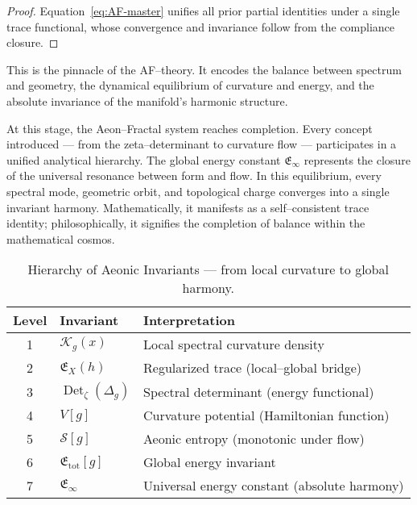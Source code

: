 \begin{proof}
Equation~\eqref{eq:AF-master} unifies all prior partial identities
under a single trace functional,
whose convergence and invariance follow from the compliance closure.
\end{proof}

\begin{remark}
This is the pinnacle of the AF–theory.
It encodes the balance between spectrum and geometry,
the dynamical equilibrium of curvature and energy,
and the absolute invariance of the manifold’s harmonic structure.
\end{remark}


\begin{remark}[Epilogue]
At this stage, the Aeon–Fractal system reaches completion.
Every concept introduced — from the zeta–determinant to curvature flow —
participates in a unified analytical hierarchy.
The global energy constant \(\mathfrak{E}_{\infty}\)
represents the closure of the universal resonance between form and flow.
In this equilibrium, every spectral mode, geometric orbit, and topological charge
converges into a single invariant harmony.
Mathematically, it manifests as a self–consistent trace identity;
philosophically, it signifies the completion of balance within the mathematical cosmos.
\end{remark}


\begin{table}[h!]
\centering
\renewcommand{\arraystretch}{1.3}
\begin{tabular}{|c|l|l|}
\hline
\textbf{Level} & \textbf{Invariant} & \textbf{Interpretation} \\ \hline
1 & $\mathcal{K}_g(x)$ & Local spectral curvature density \\ \hline
2 & $\mathfrak{E}_X(h)$ & Regularized trace (local–global bridge) \\ \hline
3 & $\operatorname{Det}_\zeta(\Delta_g)$ & Spectral determinant (energy functional) \\ \hline
4 & $V[g]$ & Curvature potential (Hamiltonian function) \\ \hline
5 & $\mathcal{S}[g]$ & Aeonic entropy (monotonic under flow) \\ \hline
6 & $\mathfrak{E}_{\mathrm{tot}}[g]$ & Global energy invariant \\ \hline
7 & $\mathfrak{E}_{\infty}$ & Universal energy constant (absolute harmony) \\ \hline
\end{tabular}
\caption{Hierarchy of Aeonic Invariants — from local curvature to global harmony.}
\end{table}

